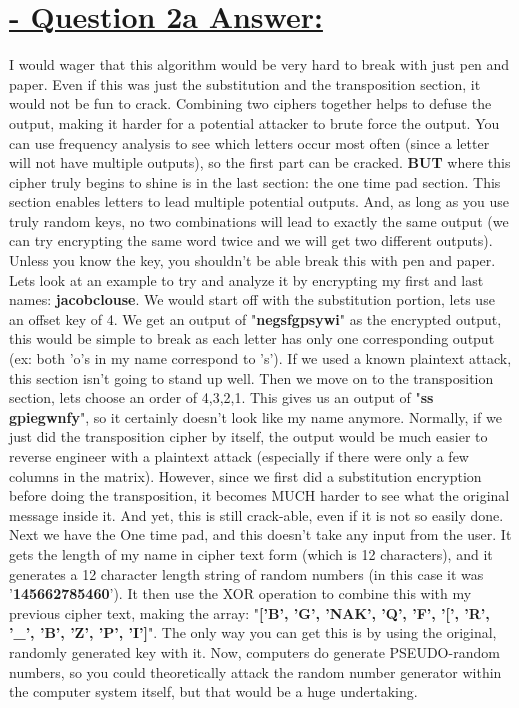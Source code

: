 \documentclass{article}
\begin{document}
\section{\underline{ - Question 2a Answer: }}
I would wager that this algorithm would be very hard to break with just pen and paper. Even if this was just the substitution and the transposition section, it would not be fun to crack. Combining two ciphers together helps to defuse the output, making it harder for a potential attacker to brute force the output. You can use frequency analysis to see which letters occur most often (since a letter will not have multiple outputs), so the first part can be cracked. \newline
\textbf{BUT} where this cipher truly begins to shine is in the last section: the one time pad section. This section enables letters to lead multiple potential outputs. And, as long as you use truly random keys, no two combinations will lead to exactly the same output (we can try encrypting the same word twice and we will get two different outputs). Unless you know the key, you shouldn't be able break this with pen and paper.\newline
Lets look at an example to try and analyze it by encrypting my first and last names: \textbf{jacobclouse}. We would start off with the substitution portion, lets use an offset key of 4. We get an output of "\textbf{negsfgpsywi}" as the encrypted output, this would be simple to break as each letter has only one corresponding output (ex: both 'o's in my name correspond to 's'). If we used a known plaintext attack, this section isn't going to stand up well. Then we move on to the transposition section, lets choose an order of 4,3,2,1. This gives us an output of "\textbf{ss gpiegwnfy}", so it certainly doesn't look like my name anymore. Normally, if we just did the transposition cipher by itself, the output would be much easier to reverse engineer with a plaintext attack (especially if there were only a few columns in the matrix). However, since we first did a substitution encryption before doing the transposition, it becomes MUCH harder to see what the original message inside it. And yet, this is still crack-able, even if it is not so easily done. Next we have the One time pad, and this doesn't take any input from the user. It gets the length of my name in cipher text form (which is 12 characters), and it generates a 12 character length string of random numbers (in this case it was '\textbf{145662785460}'). It then use the XOR operation to combine this with my previous cipher text, making the array: "\textbf{['B', 'G', 'NAK', 'Q', 'F', '[', 'R', '\_', 'B', 'Z', 'P', 'I']}". The only way you can get this is by using the original, randomly generated key with it. Now, computers do generate PSEUDO-random numbers, so you could theoretically  attack the random number generator within the computer system itself, but that would be a huge undertaking. 
\end{document}
